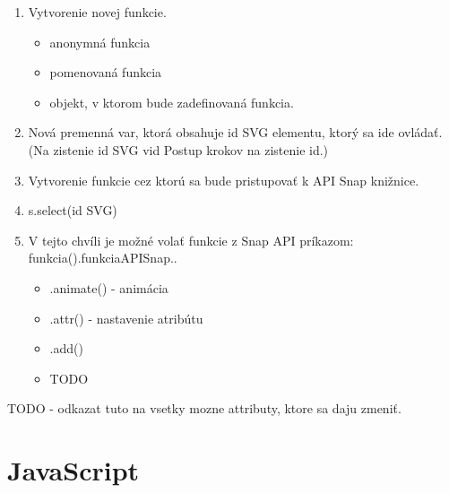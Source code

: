\begin{enumerate}
	\item Vytvorenie novej funkcie. 
	\begin{itemize}
		\item anonymná funkcia 
		\item pomenovaná funkcia
		\item objekt, v ktorom bude zadefinovaná funkcia. 
	\end{itemize}
	\item Nová premenná var, ktorá obsahuje id SVG elementu, ktorý sa ide ovládať. (Na zistenie id SVG vid Postup krokov na zistenie id.)
	\item Vytvorenie funkcie cez ktorú sa bude pristupovať k API Snap knižnice. 
	\item s.select(id SVG)
	\item V tejto chvíli je možné volať funkcie z Snap API príkazom: funkcia().funkciaAPISnap.. 
	\begin{itemize}
		\item .animate() - animácia
		\item .attr() - nastavenie atribútu
		\item .add() 
		\item TODO
		\
	\end{itemize}
	
	
	
\end{enumerate}

TODO - odkazat tuto na vsetky mozne attributy, ktore sa daju zmeniť.










\section{JavaScript}












